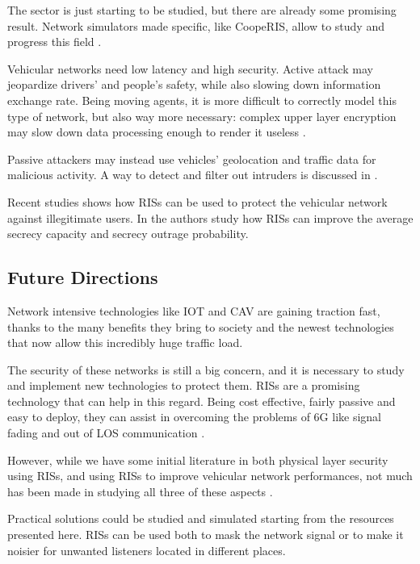 The sector is just starting to be studied, but there are already some promising result. Network simulators made specific, like CoopeRIS, allow to study and progress this field \cite{SEGATA2024110443}.

Vehicular networks need low latency and high security. Active attack may jeopardize drivers' and people's safety, while also slowing down information exchange rate. Being moving agents, it is more difficult to correctly model this type of network, but also way more necessary: complex upper layer encryption may slow down data processing enough to render it useless \cite{8403278}.

Passive attackers may instead use vehicles' geolocation and traffic data for malicious activity. A way to detect and filter out intruders is discussed in \cite{8474336}.

Recent studies shows how RISs can be used to protect the vehicular network against illegitimate users. In \cite{makarfi2020reconfigurableintelligentsurfacesenabledvehicular} the authors study how RISs can improve the average secrecy capacity and secrecy outrage probability.

\subsection{Future Directions}

Network intensive technologies like IOT and CAV are gaining traction fast, thanks to the many benefits they bring to society and the newest technologies that now allow this incredibly huge traffic load.

The security of these networks is still a big concern, and it is necessary to study and implement new technologies to protect them. RISs are a promising technology that can help in this regard. Being cost effective, fairly passive and easy to deploy, they can assist in overcoming the problems of 6G like signal fading and out of LOS communication \cite{8796365}.

However, while we have some initial literature in both physical layer security using RISs, and using RISs to improve vehicular network performances, not much has been made in studying all three of these aspects \cite{makarfi2020reconfigurableintelligentsurfacesenabledvehicular}.

Practical solutions could be studied and simulated starting from the resources presented here. RISs can be used both to mask the network signal or to make it noisier for unwanted listeners located in different places.

